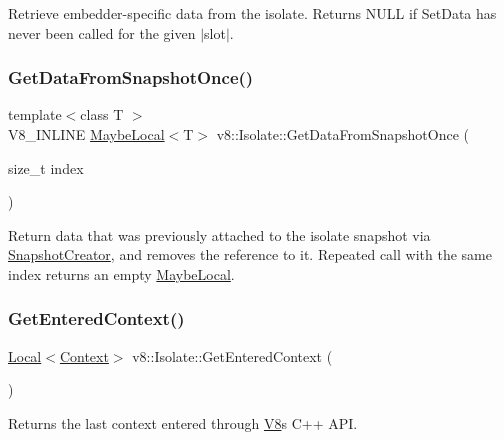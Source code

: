 Retrieve embedder-\/specific data from the isolate. Returns N\+U\+LL if Set\+Data has never been called for the given $\vert$slot$\vert$. \mbox{\label{classv8_1_1Isolate_a0f5246dda7f87caf4635d862e31444cd}} 
\subsubsection{\texorpdfstring{Get\+Data\+From\+Snapshot\+Once()}{GetDataFromSnapshotOnce()}}
{\footnotesize\ttfamily template$<$class T $>$ \\
V8\+\_\+\+I\+N\+L\+I\+NE \mbox{\hyperlink{classv8_1_1MaybeLocal}{Maybe\+Local}}$<$T$>$ v8\+::\+Isolate\+::\+Get\+Data\+From\+Snapshot\+Once (\begin{DoxyParamCaption}\item[{size\+\_\+t}]{index }\end{DoxyParamCaption})}

Return data that was previously attached to the isolate snapshot via \mbox{\hyperlink{classv8_1_1SnapshotCreator}{Snapshot\+Creator}}, and removes the reference to it. Repeated call with the same index returns an empty \mbox{\hyperlink{classv8_1_1MaybeLocal}{Maybe\+Local}}. \mbox{\label{classv8_1_1Isolate_aff9eb2f5d199f8fcf59d9699194cd2e3}} 
\subsubsection{\texorpdfstring{Get\+Entered\+Context()}{GetEnteredContext()}}
{\footnotesize\ttfamily \mbox{\hyperlink{classv8_1_1Local}{Local}}$<$\mbox{\hyperlink{classv8_1_1Context}{Context}}$>$ v8\+::\+Isolate\+::\+Get\+Entered\+Context (\begin{DoxyParamCaption}{ }\end{DoxyParamCaption})}

Returns the last context entered through \mbox{\hyperlink{classv8_1_1V8}{V8}}\textquotesingle{}s C++ A\+PI. \mbox{\label{classv8_1_1Isolate_ab8f1c70939412f99f13db3e67bb2ffdc}} 
